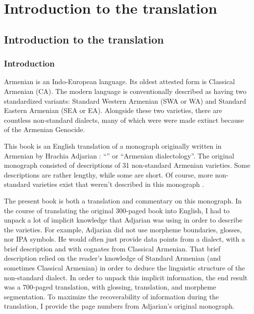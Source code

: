 \part{Introduction to the translation}




\chapter{Introduction to the translation}\label{chapter:HossepIntro}


\section{Introduction}

 

Armenian is an Indo-European language. Its oldest attested form is Classical Armenian (CA). The modern language is conventionally described as having two standardized variants: Standard Western Armenian (SWA or WA) and Standard Eastern Armenian (SEA or EA). Alongside these two varieties, there are countless non-standard dialects, many of which were were made extinct because of the Armenian Genocide. 

This book is an English translation of a monograph originally written in Armenian by Hrachia Adjarian \citep{Adjarian-1911-DialectologyBook}: ``'' or ``Armenian dialectology''. The original monograph consisted of descriptions of 31 non-standard Armenian varieties. Some descriptions are rather lengthy, while some are short.  Of course, more non-standard varieties exist that weren't described in this monograph  \citep{GreppinKhachaturian-1986-HandbookArmenianDialectology,Martirosyan-2019-Armeniandialects,Martirosyan-2019-ArmenianDialectsBigVersionRussianJournal,DolatianEtAl-prep-IranianGrammar}.

The present book is both a translation and commentary on this monograph. In the course of translating the original 300-paged book into English, I had to unpack a lot of implicit knowledge that Adjarian was using in order to describe the varieties. For example, Adjarian did not use morpheme boundaries, glosses, nor IPA symbols. He would often just provide data points from a dialect, with a brief  description and with cognates from Classical Armenian. That brief description relied on the reader's knowledge of Standard Armenian (and sometimes Classical Armenian) in order to deduce the linguistic structure of the non-standard dialect. In order to unpack this implicit information, the end result was a 700-paged translation, with glossing, translation, and morpheme segmentation. To maximize the recoverability of information during the translation, I provide the page numbers from Adjarian's original monograph. 

